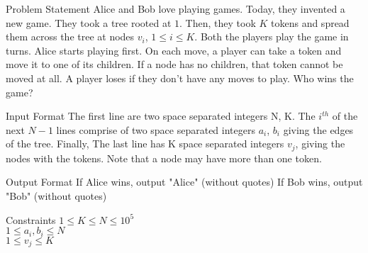 \documentclass[a4 paper]{article}
\begin{document}
\pagestyle{myheadings}
\thispagestyle{plain}
\newpage
\setcounter{page}{1}
\noindent
\begin{center}
\end{center}
\vspace*{4mm}

\begin{section}{Problem Statement}
Alice and Bob love playing games. Today, they invented a new game.  They took a tree rooted at $1$. Then, they took $K$ tokens and spread them across the tree at nodes $v_i$, $1 \leq i \leq K$. Both the players play the game in turns. Alice starts playing first. 
On each move, a player can take a token and move it to one of its children. If a node has no children, that token cannot be moved at all. A player loses if they don't have any moves to play. Who wins the game? 
\end{section}

\begin{section}{Input Format}
The first line are two space separated integers N, K. 
The $i^{th}$ of the next $N-1$ lines comprise of two space separated integers $a_i$, $b_i$ giving the edges of the tree.
Finally, The last line has K space separated integers $v_j$, giving the nodes with the tokens. Note that a node may have more than one token. 
\end{section}

\begin{section}{Output Format}
If Alice wins, output "Alice" (without quotes)
If Bob wins, output "Bob" (without quotes)
\end{section}

\begin{section}{Constraints} 
$ 1 \leq K \leq N \leq 10^5 $ \\
$ 1 \leq a_i, b_i \leq N $ \\
$ 1 \leq v_j \leq K$
\end{section}
\end{document}
